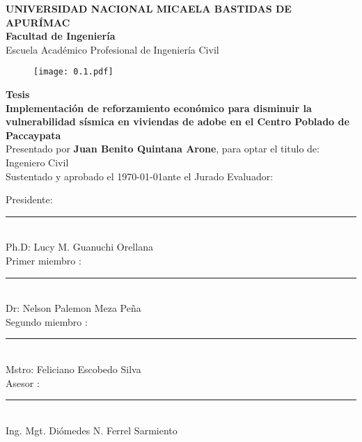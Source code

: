 \begin{titlepage}
	\begin{center}
		\textbf{\large{UNIVERSIDAD NACIONAL MICAELA BASTIDAS DE APURÍMAC}}\\
		\textbf{\large{Facultad de Ingeniería}\\}
		\large{Escuela Académico Profesional de Ingeniería Civil}\\
		\vspace{2mm}
		\begin{figure}[h!]
			\centering
			\texttt{[image: 0.1.pdf]}
		\end{figure}
		\textbf{Tesis}\\
		\vspace{2mm} 
		\textbf{Implementación de reforzamiento económico para disminuir la vulnerabilidad sísmica en viviendas de adobe en el Centro Poblado de Paccaypata}\\
		Presentado por \textbf{Juan Benito Quintana Arone}, para optar el titulo de: Ingeniero Civil \\
Sustentado y aprobado el \today \hspace{2mm}ante el Jurado Evaluador:
\vspace{7mm}%
		\begin{center}
			Presidente: \hfill \rule{9cm}{0.4pt}\\
			\hspace{7cm} {\sffamily Ph.D: Lucy M. Guanuchi Orellana} \\
			\vspace{7mm}
			Primer miembro	:\hfill \rule{9cm}{0.4pt}\\
			\hspace{7cm} {\sffamily Dr: Nelson Palemon Meza Peña} \\		
			\vspace{7mm}
			Segundo miembro	:\hfill \rule{9cm}{0.4pt}\\
			\hspace{7cm} {\sffamily Mstro: Feliciano Escobedo Silva} \\		
			\vspace{7mm}
			\large Asesor	: \hfill \rule{9cm}{0.4pt}\\	
			\hspace{7cm} { Ing. Mgt. Diómedes N. Ferrel Sarmiento} \\	
		\end{center}
		
		\vfill
		
	\end{center}
\end{titlepage}